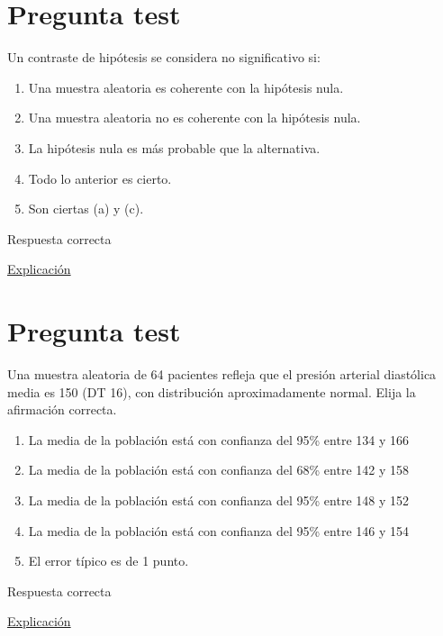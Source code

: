 \documentclass[
]{book}
\providecommand{\tightlist}{%
  \setlength{\itemsep}{0pt}\setlength{\parskip}{0pt}}
\begin{document}
\hypertarget{pregunta-test-104}{%
\section{Pregunta test}\label{pregunta-test-104}}

Un contraste de hipótesis se considera no significativo si:

\begin{enumerate}
\def\labelenumi{\alph{enumi})}
\tightlist
\item
  Una muestra aleatoria es coherente con la hipótesis nula.
\item
  Una muestra aleatoria no es coherente con la hipótesis nula.
\item
  La hipótesis nula es más probable que la alternativa.
\item
  Todo lo anterior es cierto.
\item
  Son ciertas (a) y (c).
\end{enumerate}

Respuesta correcta

\href{https://1fjmanzano.github.io/bioestadistica/contrastes-de-hipo\%CC\%81tesis.html}{Explicación}

\hypertarget{pregunta-test-105}{%
\section{Pregunta test}\label{pregunta-test-105}}

Una muestra aleatoria de 64 pacientes refleja que el presión arterial diastólica media es 150 (DT 16), con distribución aproximadamente normal. Elija la afirmación correcta.

\begin{enumerate}
\def\labelenumi{\alph{enumi})}
\tightlist
\item
  La media de la población está con confianza del 95\% entre 134 y 166
\item
  La media de la población está con confianza del 68\% entre 142 y 158
\item
  La media de la población está con confianza del 95\% entre 148 y 152
\item
  La media de la población está con confianza del 95\% entre 146 y 154
\item
  El error típico es de 1 punto.
\end{enumerate}

Respuesta correcta

\href{https://homepage.divms.uiowa.edu/~mbognar/}{Explicación}
\end{document}
